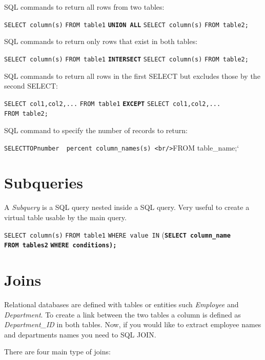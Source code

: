 \documentclass[
  letterpaper,
  DIV=11,
  numbers=noendperiod]{scrreprt}
\begin{document}
SQL commands to return all rows from two tables:

\texttt{SELECT\ column(s)} \texttt{FROM\ table1}
\textbf{\texttt{UNION\ ALL}} \texttt{SELECT\ column(s)}
\texttt{FROM\ table2;}

SQL commands to return only rows that exist in both tables:

\texttt{SELECT\ column(s)} \texttt{FROM\ table1}
\textbf{\texttt{INTERSECT}} \texttt{SELECT\ column(s)}
\texttt{FROM\ table2;}

SQL commands to return all rows in the first SELECT but excludes those
by the second SELECT:

\texttt{SELECT\ col1,col2,...} \texttt{FROM\ table1}
\textbf{\texttt{EXCEPT}} \texttt{SELECT\ col1,col2,...}
\texttt{FROM\ table2;}

SQL command to specify the number of records to return:

\texttt{SELECTTOPnumber\ \textbar{}\ percent\ column\_names(s)\ \textless{}br/\textgreater{}}FROM
table\_name;`

\hypertarget{subqueries}{%
\section*{Subqueries}\label{subqueries}}


A \emph{Subquery} is a SQL query nested inside a SQL query. Very useful
to create a virtual table usable by the main query.

\texttt{SELECT\ column(s)} \texttt{FROM\ table1}
\texttt{WHERE\ value\ IN} (\textbf{\texttt{SELECT\ column\_name}}
\textbf{\texttt{FROM\ tables2}} \textbf{\texttt{WHERE\ conditions);}}

\hypertarget{joins}{%
\section*{Joins}\label{joins}}


Relational databases are defined with tables or entities such
\emph{Employee} and \emph{Department}. To create a link between the two
tables a column is defined as \emph{Department\_ID} in both tables. Now,
if you would like to extract employee names and departments names you
need to SQL JOIN.

There are four main type of joins:
\end{document}
